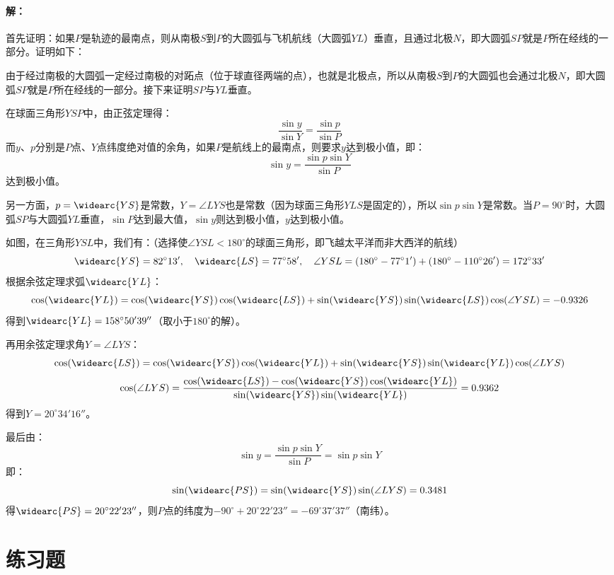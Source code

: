 \documentclass[a4paper]{article}
\begin{document}
\paragraph{解：}

首先证明：如果$P$是轨迹的最南点，则从南极$S$到$P$的大圆弧与飞机航线（大圆弧$YL$）垂直，且通过北极$N$，即大圆弧$SP$就是$P$所在经线的一部分。证明如下：

由于经过南极的大圆弧一定经过南极的对跖点（位于球直径两端的点），也就是北极点，所以从南极$S$到$P$的大圆弧也会通过北极$N$，即大圆弧$SP$就是$P$所在经线的一部分。接下来证明$SP$与$YL$垂直。

在球面三角形$YSP$中，由正弦定理得：
\[
    \frac{\sin y}{\sin Y} = \frac{\sin p}{\sin P}
\]
而$y$、$p$分别是$P$点、$Y$点纬度绝对值的余角，如果$P$是航线上的最南点，则要求$y$达到极小值，即：
\[
    \sin y = \frac{\sin p\sin Y}{\sin P}
\]
达到极小值。

另一方面，$p = \widearc{YS}$是常数，$Y = \angle LYS$也是常数（因为球面三角形$YLS$是固定的），所以$\sin p\sin Y$是常数。当$P=90^\circ$时，大圆弧$SP$与大圆弧$YL$垂直，$\sin P$达到最大值，$\sin y$则达到极小值，$y$达到极小值。

如图，在三角形$YSL$中，我们有：（选择使$\angle YSL < 180^\circ$的球面三角形，即飞越太平洋而非大西洋的航线）
\[
    \widearc{YS} = 82^\circ13',\quad \widearc{LS} = 77^\circ58',\quad \angle YSL = (180^\circ - 77^\circ1') + (180^\circ - 110^\circ26') = 172^\circ33'
\]
根据余弦定理求弧$\widearc{YL}$：
\[
    \cos(\widearc{YL}) = \cos(\widearc{YS})\cos(\widearc{LS}) + \sin(\widearc{YS})\sin(\widearc{LS})\cos(\angle YSL) = -0.9326
\]
得到$\widearc{YL} = 158^\circ50'39''$（取小于$180^\circ$的解）。

再用余弦定理求角$Y=\angle LYS$：
\[
    \cos(\widearc{LS}) = \cos(\widearc{YS})\cos(\widearc{YL}) + \sin(\widearc{YS})\sin(\widearc{YL})\cos(\angle LYS)
\]
\[
    \cos(\angle LYS) = \frac{\cos(\widearc{LS}) - \cos(\widearc{YS})\cos(\widearc{YL})}{\sin(\widearc{YS})\sin(\widearc{YL})} = 0.9362
\]
得到$Y = 20^\circ34'16''$。

最后由：
\[
    \sin y = \frac{\sin p\sin Y}{\sin P} = \sin p\sin Y
\]
即：
\[
    \sin(\widearc{PS}) = \sin(\widearc{YS}) \sin(\angle LYS) = 0.3481
\]
得$\widearc{PS} = 20^\circ22'23''$，则$P$点的纬度为$-90^\circ + 20^\circ22'23'' = -69^\circ37'37''$（南纬）。

\newpage
\section{练习题}
\end{document}
